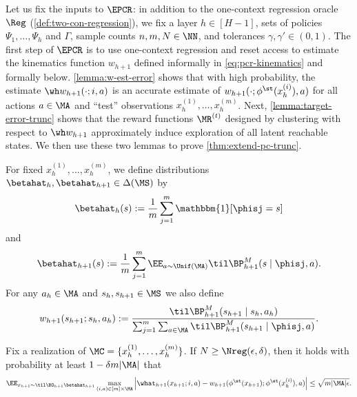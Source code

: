 Let us fix the inputs to $\EPCR$: in addition to the one-context regression oracle $\Reg$ (\cref{def:two-con-regression}), we fix a layer $h \in [H-1]$, sets of policies $\Psi_1,\dots,\Psi_h$ and $\Gamma$, sample counts $n,m,N \in \NN$, and tolerances $\gamma,\gamma' \in (0,1)$. The first step of $\EPCR$ is to use one-context regression and reset access to estimate the kinematics function $w_{h+1}$ defined informally in \cref{eq:pcr-kinematics} and formally below. \cref{lemma:w-est-error} shows that with high probability, the estimate $\wh w_{h+1}(\cdot;i,a)$ is an accurate estimate of $w_{h+1}(\cdot;\phi^\st(x_h^{(i)}),a)$ for all actions $a \in \MA$ and ``test'' observations $x_h^{(1)},\dots,x_h^{(m)}$. Next, \cref{lemma:target-error-trunc} shows that the reward functions $\MR^{(t)}$ designed by clustering with respect to $\wh w_{h+1}$ approximately induce exploration of all latent reachable states. We then use these two lemmas to prove \cref{thm:extend-pc-trunc}.

\begin{definition}\label{def:beta-w}
For fixed $x^{(1)}_h,\dots,x^{(m)}_h$, we define distributions $\betahat_h,\betahat_{h+1} \in \Delta(\MS)$ by 
\[\betahat_h(s) := \frac{1}{m}\sum_{j=1}^m \mathbbm{1}[\phisj=s]\]
and
\[\betahat_{h+1}(s) := \frac{1}{m}\sum_{j=1}^m \EE_{a\sim\Unif(\MA)} \til\BP^M_{h+1}(s\mid{}\phisj, a).\]
For any $a_h \in \MA$ and $s_h,s_{h+1}\in\MS$ we also define
\[w_{h+1}(s_{h+1};s_h,a_h) := \frac{\til \BP^M_{h+1}(s_{h+1}\mid{}s_h,a_h)}{\sum_{j=1}^m\sum_{a \in \MA} \til\BP^M_{h+1}(s_{h+1}\mid{}\phisj,a)}.\]
\end{definition}

\begin{lemma}\label{lemma:w-est-error}
Fix a realization of $\MC = \{x_h^{(1)},\dots,x_h^{(m)}\}$. If $N \geq \Nreg(\epsilon,\delta)$, then it holds with probability at least $1-\delta m |\MA|$ that
\begin{equation}\EE_{x_{h+1} \sim \til\BO_{h+1} \betahat_{h+1}} \max_{(i,a) \in [m]\times\MA} \left|\what_{h+1}(x_{h+1};i,a) - w_{h+1}(\phi^\st(x_{h+1});\phi^\st(x_h^{(i)}),a) \right| \leq \sqrt{m|\MA|\epsilon}.
\label{eq:w-est-error}
\end{equation}
\end{lemma}

